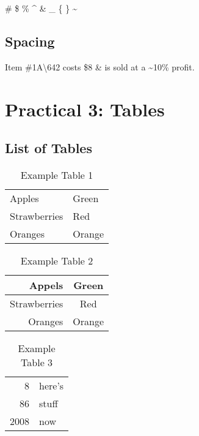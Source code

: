 \documentclass[a4paper,12pt]{report}
\begin{document}
\# \$ \% \^{} \& \_ \{ \} \~{}

\section{Spacing}
\vspace{12pt}
\vspace{12pt}
\vspace{12pt}

Item \#1A\textbackslash642 costs \$8 \& is sold at a \~{}10\% profit.


\chapter*{Practical 3: Tables}

\section{List of Tables}

\begin{table}[ht]
\label{Table 1}
	\begin{tabular}{|l|l|}
	Apples & Green\\
	Strawberries & Red\\
	Oranges & Orange\\
	\end{tabular}
\caption{Example Table 1}
\label{Table 1}
\end{table}

\begin{table}[ht]
\label{Table 2}
	\begin{tabular}{rc}
	Appels & Green\\
	\hline
	Strawberries & Red\\
	\cline{2-2}
	Oranges & Orange\\
	\end{tabular}
\caption{Example Table 2}
\end{table}

\begin{table}[ht]
\label{Table 3}
\begin{tabular}{|r|l|}
	\hline
	8 & here's\\
	\cline{2-2}
	86 & stuff\\
	\hline
	\hline
	2008 & now\\
	\hline
	\end{tabular}
\caption{Example Table 3}
\end{table}
\end{document}

